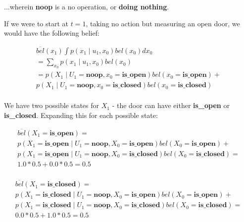 \documentclass{article}
\begin{document}
...wherein \textbf{noop} is a no operation, or \textbf{doing nothing}.

If we were to start at $t=1$, taking no action but measuring an open door, we would have the following belief:

\begin{equation}
    \begin{split}
        \overline{bel}(x_1) \int p(x_1 \mid u_1, x_0) bel(x_0)dx_0 \\
        = \sum_{x_0} p(x_1 \mid u_1, x_0) bel(x_0) \\
        = p(X_1 \mid U_1 = \textbf{noop}, x_0 = \textbf{is\_open}) bel(x_0 = \textbf{is\_open}) + \\
        p(X_1 \mid U_1 = \textbf{noop}, x_0 = \textbf{is\_closed}) bel(x_0 = \textbf{is\_closed}) \\
    \end{split}
\end{equation}

We have two possible states for $X_1$ - the door can have either \textbf{is\_open} or \textbf{is\_closed}. Expanding this for each possible state:

\begin{equation}
    \begin{split}
        \overline{bel}(X_1=\textbf{is\_open}) = \\
        p(X_1 = \textbf{is\_open} \mid U_1 = \textbf{noop}, X_0 = \textbf{is\_open}) bel(X_0 = \textbf{is\_open}) + \\
        p(X_1 = \textbf{is\_open} \mid U_1 = \textbf{noop}, X_0 = \textbf{is\_closed}) bel(X_0 = \textbf{is\_closed}) = \\
        1.0 * 0.5 + 0.0 * 0.5 = 0.5 \\
    \end{split}
\end{equation}

\begin{equation}
    \begin{split}
        \overline{bel}(X_1=\textbf{is\_closed}) = \\
        p(X_1 = \textbf{is\_closed} \mid U_1 = \textbf{noop}, X_0 = \textbf{is\_open}) bel(X_0 = \textbf{is\_open}) + \\
        p(X_1 = \textbf{is\_closed} \mid U_1 = \textbf{noop}, X_0 = \textbf{is\_closed}) bel(X_0 = \textbf{is\_closed}) = \\
        0.0 * 0.5 + 1.0 * 0.5 = 0.5 \\
    \end{split}
\end{equation}
\end{document}
